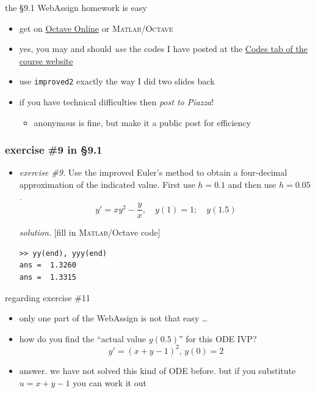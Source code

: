 \documentclass[urlcolor=blue,dvipsnames]{beamer}
\newcommand{\Matlab}{\textsc{Matlab}\xspace}
\newcommand{\Octave}{\textsc{Octave}\xspace}
\begin{document}
\begin{frame}{the \S9.1 WebAssign homework is easy}

\begin{itemize}
\item get on \href{https://octave-online.net/}{Octave Online} or \Matlab/\Octave
\item yes, you may and should \emph{use} the codes I have posted at the \href{https://bueler.github.io/math302/codes.html}{Codes tab of the course website}
\item use \texttt{improved2} exactly the way I did two slides back
\item if you have technical difficulties then \emph{post to Piazza}!
    \begin{itemize}
    \item anonymous is fine, but make it a public post for efficiency
    \end{itemize}
\end{itemize}
\end{frame}


\begin{frame}[fragile]
\frametitle{exercise \#9 in \S9.1}

\begin{itemize}
\item \emph{exercise \#9.}  Use the improved Euler's method to obtain a four-decimal approximation of the indicated value.  First use $h=0.1$ and then use $h=0.05$.
    $$y'=xy^2-\frac{y}{x}, \quad y(1)=1; \quad y(1.5)$$

\noindent \emph{solution.} [fill in \Matlab/Octave code]

\vspace{30mm}
\begin{Verbatim}[fontsize=\small]
>> yy(end), yyy(end)
ans =  1.3260
ans =  1.3315
\end{Verbatim}
\end{itemize}
\end{frame}

\begin{frame}{regarding exercise \#11}

\begin{itemize}
\item only one part of the WebAssign is not that easy \dots
\item how do you find the ``actual value $y(0.5)$'' for this ODE IVP?
    $$y'=(x+y-1)^2, \, y(0)=2$$
\item \alert{answer.}  we have not solved this kind of ODE before.  but if you substitute $u=x+y-1$ you can work it out
\end{itemize}
\end{frame}
\end{document}
